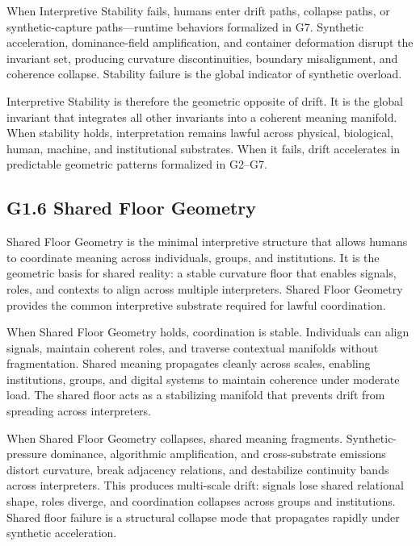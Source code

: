 \medskip

\noindent When Interpretive Stability fails, humans enter drift paths, collapse
paths, or synthetic-capture paths—runtime behaviors formalized in G7. Synthetic
acceleration, dominance-field amplification, and container deformation disrupt
the invariant set, producing curvature discontinuities, boundary misalignment,
and coherence collapse. Stability failure is the global indicator of synthetic
overload.

\medskip

\noindent Interpretive Stability is therefore the geometric opposite of drift. It
is the global invariant that integrates all other invariants into a coherent
meaning manifold. When stability holds, interpretation remains lawful across
physical, biological, human, machine, and institutional substrates. When it
fails, drift accelerates in predictable geometric patterns formalized in G2--G7.

\subsection*{G1.6 Shared Floor Geometry}

\noindent Shared Floor Geometry is the minimal interpretive structure that allows
humans to coordinate meaning across individuals, groups, and institutions. It is
the geometric basis for shared reality: a stable curvature floor that enables
signals, roles, and contexts to align across multiple interpreters. Shared Floor
Geometry provides the common interpretive substrate required for lawful
coordination.

\medskip

\noindent When Shared Floor Geometry holds, coordination is stable. Individuals
can align signals, maintain coherent roles, and traverse contextual manifolds
without fragmentation. Shared meaning propagates cleanly across scales, enabling
institutions, groups, and digital systems to maintain coherence under moderate
load. The shared floor acts as a stabilizing manifold that prevents drift from
spreading across interpreters.

\medskip

\noindent When Shared Floor Geometry collapses, shared meaning fragments.
Synthetic-pressure dominance, algorithmic amplification, and cross-substrate
emissions distort curvature, break adjacency relations, and destabilize
continuity bands across interpreters. This produces multi-scale drift: signals
lose shared relational shape, roles diverge, and coordination collapses across
groups and institutions. Shared floor failure is a structural collapse mode that
propagates rapidly under synthetic acceleration.

